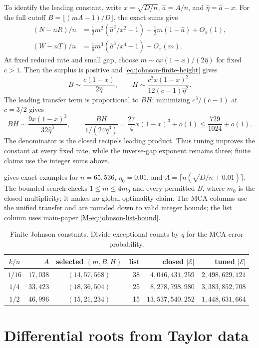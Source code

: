 \documentclass[11pt,letterpaper]{article}
\theoremstyle{definition}
\newcommand{\gJohnson}{\eta_0}
\begin{document}
To identify the leading constant, write $x=\sqrt{D/n}$,
$\widehat a=A/n$, and $\widehat\eta=\widehat a-x$. For the full cutoff
$B=\lfloor(mA-1)/D\rfloor$, the exact sums give
\begin{align*}
 (N-nR)/n
 &=\tfrac12m^2(\widehat a^2/x^2-1)
       -\tfrac12m(1-\widehat a)+O_x(1),\\
 (W-nT)/n
 &=\tfrac16m^3(\widehat a^3/x^4-1)+O_x(m).
\end{align*}
At fixed reduced rate and small gap, choose
$m\sim cx(1-x)/(2\widehat\eta)$ for fixed $c>1$.
Then the surplus is positive and \eqref{eq:johnson-finite-height} gives
\[
 B\sim\frac{c(1-x)}{2\widehat\eta},\qquad
 H\sim\frac{c^2x(1-x)^2}{12(c-1)\widehat\eta^2}.
\]
The leading transfer term is proportional to $BH$; minimizing
$c^3/(c-1)$ at $c=3/2$ gives
\[
 BH\sim\frac{9x(1-x)^3}{32\widehat\eta^3},\qquad
 \frac{BH}{1/(24\widehat\eta^3)}
 =\frac{27}{4}x(1-x)^3+o(1)\le\frac{729}{1024}+o(1).
\]
The denominator is the closed recipe's leading product. Thus tuning
improves the constant at every fixed rate, while the inverse-gap exponent
remains three; finite claims use the integer sums above.

 gives exact examples for
$n=65{,}536$, $\gJohnson=0.01$, and
$A=\lceil n(\sqrt{D/n}+0.01)\rceil$. The bounded search checks
$1\le m\le4m_0$ and every permitted $B$, where $m_0$ is the closed
multiplicity; it makes no global optimality claim. The MCA columns use the
unified transfer and are rounded down to valid integer bounds; the list
column uses main-paper \eqref{M-eq:johnson-list-bound}.
\begin{table}[!t]
\centering\small
\begin{tabular}{c r c r r r}
\toprule
$k/n$ & $A$ & selected $(m,B,H)$ & list & closed $|\mathcal E|$ & tuned $|\mathcal E|$\\
\midrule
$1/16$ & $17{,}038$ & $(14,57,568)$ & 38 & $4{,}046{,}431{,}259$ & $2{,}498{,}629{,}121$\\
$1/4$ & $33{,}423$ & $(18,36,504)$ & 25 & $8{,}278{,}798{,}980$ & $3{,}383{,}852{,}708$\\
$1/2$ & $46{,}996$ & $(15,21,234)$ & 15 & $13{,}537{,}540{,}252$ & $1{,}448{,}631{,}664$\\
\bottomrule
\end{tabular}
\caption{Finite Johnson constants. Divide exceptional counts by $q$
for the MCA error probability.}
\label{tab:johnson-finite-constants}
\end{table}
 \section{Differential roots from Taylor data}
\label{sec:root-finding}
\end{document}
